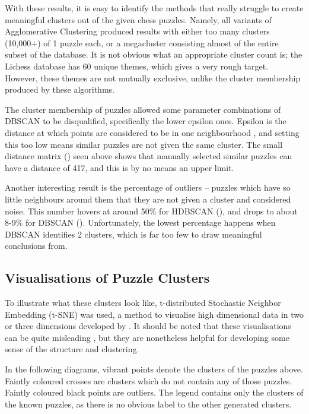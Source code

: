 With these results, it is easy to identify the methods that really struggle to
create meaningful clusters out of the given chess puzzles. Namely, all variants
of Agglomerative Clustering produced results with either too many clusters
(10,000+) of 1 puzzle each, or a megacluster consisting almost of the entire
subset of the database. It is not obvious what an appropriate cluster count is;
the Lichess database has 60 unique themes, which gives a very rough target.
However, these themes are not mutually exclusive, unlike the cluster membership
produced by these algorithms. 

The cluster membership of puzzles allowed some parameter combinations of DBSCAN
to be disqualified, specifically the lower epsilon ones. Epsilon is the
distance at which points are considered to be in one neighbourhood
\citep{dbscan}, and setting this too low means similar puzzles are not given
the same cluster. The small distance matrix () seen
above shows that manually selected similar puzzles can have a distance of 417,
and this is by no means an upper limit.

Another interesting result is the percentage of outliers -- puzzles which have
so little neighbours around them that they are not given a cluster and
considered noise. This number hovers at around 50\% for HDBSCAN
(), and drops to about 8-9\% for DBSCAN ().
Unfortunately, the lowest percentage happens when DBSCAN identifies 2 clusters,
which is far too few to draw meaningful conclusions from.

\subsection{Visualisations of Puzzle Clusters}\label{treeS23}

To illustrate what these clusters look like, t-distributed Stochastic Neighbor
Embedding (t-SNE) was used, a method to visualise high dimensional data in two
or three dimensions developed by \citet{tsne}. It should be noted that these
visualisations can be quite misleading \citep{wattenberg2016how}, but they are
nonetheless helpful for developing some sense of the structure and clustering.

In the following diagrams, vibrant points denote the clusters of the puzzles
above. Faintly coloured crosses are clusters which do not contain any of those
puzzles. Faintly coloured black points are outliers. The legend contains only
the clusters of the known puzzles, as there is no obvious label to the other
generated clusters.


